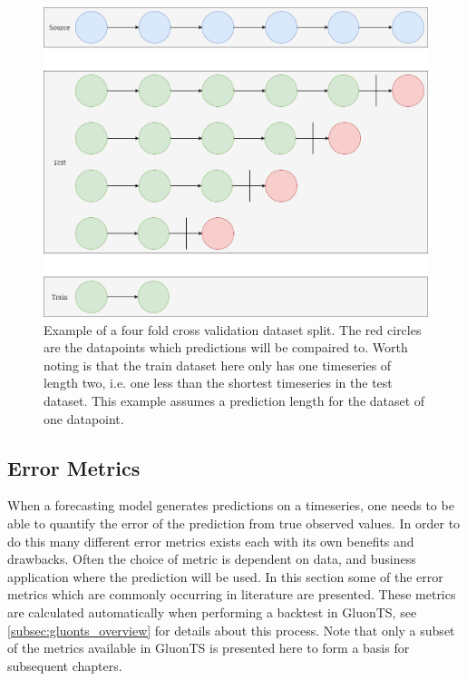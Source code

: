 \begin{figure}[htb]
    \centering
        \includegraphics[width=\linewidth]{2_background/figures/k_fold_validation.png}
        \caption{Example of a four fold cross validation dataset split. The red circles are the datapoints which predictions will be compaired to. Worth noting is that the train dataset here only has one timeseries of length two, i.e. one less than the shortest timeseries in the test dataset. This example assumes a prediction length for the dataset of one datapoint.}
    \endminipage\hfill
\end{figure}
\label{fig:k_fold_validation}

\subsection{Error Metrics}
\label{subsec:error_metrics}
When a forecasting model generates predictions on a timeseries, one needs to be able to quantify the error of the prediction from true observed values. In order to do this many different error metrics exists each with its own benefits and drawbacks. Often the choice of metric is dependent on data, and business application where the prediction will be used. In this section some of the error metrics which are commonly occurring in literature are presented. These metrics are calculated automatically when performing a backtest in GluonTS, see \ref{subsec:gluonts_overview} for details about this process. Note that only a subset of the metrics available in GluonTS is presented here to form a basis for subsequent chapters.

